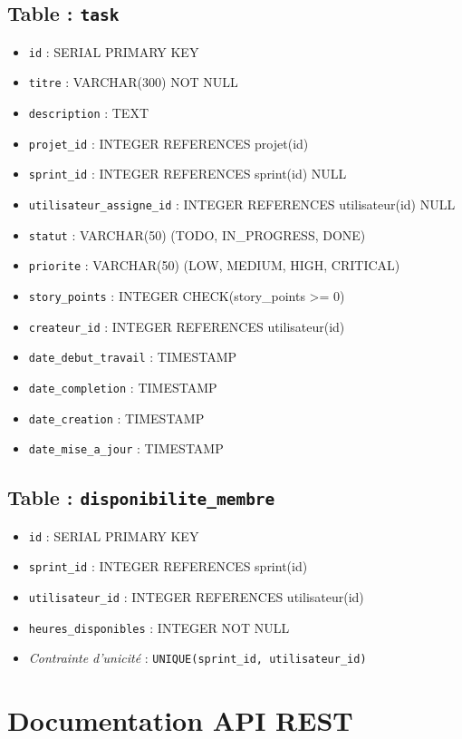 \documentclass[12pt,a4paper]{report}
\begin{document}
\section*{Table : \texttt{task}}
\begin{itemize}
\item \verb|id| : SERIAL PRIMARY KEY
\item \verb|titre| : VARCHAR(300) NOT NULL
\item \verb|description| : TEXT
\item \verb|projet_id| : INTEGER REFERENCES projet(id)
\item \verb|sprint_id| : INTEGER REFERENCES sprint(id) NULL
\item \verb|utilisateur_assigne_id| : INTEGER REFERENCES utilisateur(id) NULL
\item \verb|statut| : VARCHAR(50) (TODO, IN\_PROGRESS, DONE)
\item \verb|priorite| : VARCHAR(50) (LOW, MEDIUM, HIGH, CRITICAL)
\item \verb|story_points| : INTEGER CHECK(story\_points >= 0)
\item \verb|createur_id| : INTEGER REFERENCES utilisateur(id)
\item \verb|date_debut_travail| : TIMESTAMP
\item \verb|date_completion| : TIMESTAMP
\item \verb|date_creation| : TIMESTAMP
\item \verb|date_mise_a_jour| : TIMESTAMP
\end{itemize}

\section*{Table : \texttt{disponibilite\_membre}}
\begin{itemize}
\item \verb|id| : SERIAL PRIMARY KEY
\item \verb|sprint_id| : INTEGER REFERENCES sprint(id)
\item \verb|utilisateur_id| : INTEGER REFERENCES utilisateur(id)
\item \verb|heures_disponibles| : INTEGER NOT NULL
\item \textit{Contrainte d'unicité} : \verb|UNIQUE(sprint_id, utilisateur_id)|
\end{itemize}

\chapter{Documentation API REST}
\end{document}
